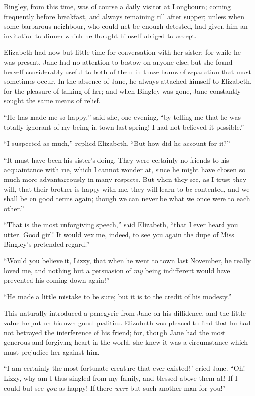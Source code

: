 Bingley, from this time, was of course a daily visitor at
Longbourn; coming frequently before breakfast, and always
remaining till after supper; unless when some barbarous
neighbour, who could not be enough detested, had given him
an invitation to dinner which he thought himself obliged to
accept.

Elizabeth had now but little time for conversation with her
sister; for while he was present, Jane had no attention to
bestow on anyone else; but she found herself considerably
useful to both of them in those hours of separation that must
sometimes occur.  In the absence of Jane, he always attached
himself to Elizabeth, for the pleasure of talking of her; and
when Bingley was gone, Jane constantly sought the same means
of relief.

``He has made me so happy,'' said she, one evening, ``by telling
me that he was totally ignorant of my being in town last
spring!  I had not believed it possible.''

``I suspected as much,'' replied Elizabeth.  ``But how did he
account for it?''

``It must have been his sister's doing.  They were certainly no
friends to his acquaintance with me, which I cannot wonder at,
since he might have chosen so much more advantageously in many
respects.  But when they see, as I trust they will, that their
brother is happy with me, they will learn to be contented, and
we shall be on good terms again; though we can never be what we
once were to each other.''

``That is the most unforgiving speech,'' said Elizabeth, ``that
I ever heard you utter.  Good girl!  It would vex me, indeed,
to see you again the dupe of Miss Bingley's pretended regard.''

``Would you believe it, Lizzy, that when he went to town last
November, he really loved me, and nothing but a persuasion of
\emph{my} being indifferent would have prevented his coming down
again!''

``He made a little mistake to be sure; but it is to the credit
of his modesty.''

This naturally introduced a panegyric from Jane on his
diffidence, and the little value he put on his own good
qualities.  Elizabeth was pleased to find that he had not
betrayed the interference of his friend; for, though Jane had
the most generous and forgiving heart in the world, she knew
it was a circumstance which must prejudice her against him.

``I am certainly the most fortunate creature that ever existed!''
cried Jane.  ``Oh! Lizzy, why am I thus singled from my family,
and blessed above them all!  If I could but see \emph{you} as happy!
If there \emph{were} but such another man for you!''

